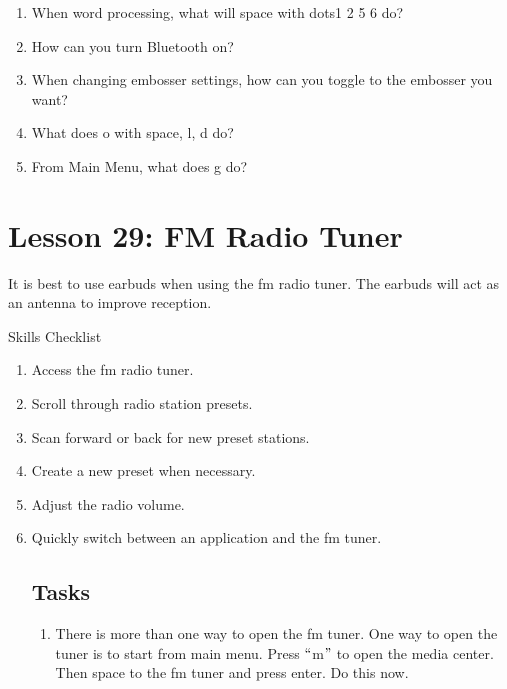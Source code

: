 \documentclass[10pt,letterpaper,twoside]{report}
\begin{document}
{{{{\begin{enumerate}
	\item When word processing, what will space with dots1 2 5 6 do?
	      
	\item How can you turn Bluetooth on?
	      
	\item When changing embosser settings, how can you toggle to the embosser you want?
	      
	\item What does o with space, l, d do?
	      
	\item From Main Menu, what does g do?
\end{enumerate}

\section*{Lesson 29: FM Radio Tuner}


It is best to use earbuds when using the fm radio tuner. The earbuds will act as an antenna to improve reception.



Skills Checklist



\begin{enumerate}
	\item Access the fm radio tuner.
	      
	\item Scroll through radio station presets.
	      
	\item Scan forward or back for new preset stations.
	      
	\item Create a new preset when necessary.
	      
	\item Adjust the radio volume.
	      
	\item Quickly switch between an application and the fm tuner.
	      
	      
	      
	       \subsection{Tasks}
	      
	      
	      
	      \begin{enumerate}
		      \item There is more than one way to open the fm tuner. One way to open the tuner is to start from main menu. Press $``$m$"$  to open the media center. Then space to the fm tuner and press enter. Do this now.
		            

\end{enumerate}
\end{enumerate}}}}}
\end{document}
